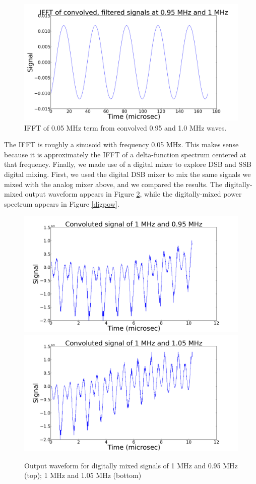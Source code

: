 \documentclass[11pt]{article}
\begin{document}
\begin{figure}
\centering
\includegraphics[scale=0.35]{pictures/ifft}
\caption{IFFT of 0.05 MHz term from convolved 0.95 and 1.0 MHz waves. \label{ifft}}
\end{figure}

The IFFT is roughly a sinusoid with frequency 0.05 MHz. This makes sense because it is approximately the IFFT of a delta-function spectrum centered at that frequency.  Finally, we made use of a digital mixer to explore DSB and SSB digital mixing. First, we used the digital DSB mixer to mix the same signals we mixed with the analog mixer above, and we compared the results. The digitally-mixed output waveform appears in Figure \ref{dwave}, while the digitally-mixed power spectrum appears in Figure \ref{digpow}.

\begin{figure}
\centering
\includegraphics[scale=0.35]{pictures/digitaloninefivewave}
\includegraphics[scale=0.35]{pictures/digitaloneofivewave}
\caption{Output waveform for digitally mixed signals of 1 MHz and 0.95 MHz (top); 1 MHz and 1.05 MHz (bottom) \label{dwave}}
\end{figure}
\end{document}
